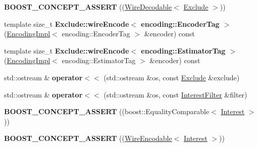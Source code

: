 \begin{DoxyCompactItemize}
\item 
{\bfseries B\+O\+O\+S\+T\+\_\+\+C\+O\+N\+C\+E\+P\+T\+\_\+\+A\+S\+S\+E\+RT} ((\hyperlink{classndn_1_1WireDecodable}{Wire\+Decodable}$<$ \hyperlink{classndn_1_1Exclude}{Exclude} $>$))\hypertarget{namespacendn_ac880ccd4f41297a74cac775e4c40661e}{}\label{namespacendn_ac880ccd4f41297a74cac775e4c40661e}

\item 
template size\+\_\+t {\bfseries Exclude\+::wire\+Encode$<$ encoding\+::\+Encoder\+Tag $>$} (\hyperlink{classndn_1_1encoding_1_1EncodingImpl}{Encoding\+Impl}$<$ encoding\+::\+Encoder\+Tag $>$ \&encoder) const\hypertarget{namespacendn_a38a7e12fd5c4f17a2ddd480d8f56fbe0}{}\label{namespacendn_a38a7e12fd5c4f17a2ddd480d8f56fbe0}

\item 
template size\+\_\+t {\bfseries Exclude\+::wire\+Encode$<$ encoding\+::\+Estimator\+Tag $>$} (\hyperlink{classndn_1_1encoding_1_1EncodingImpl}{Encoding\+Impl}$<$ encoding\+::\+Estimator\+Tag $>$ \&encoder) const\hypertarget{namespacendn_aff4fb8eecda68e37e99044b2024e0e4e}{}\label{namespacendn_aff4fb8eecda68e37e99044b2024e0e4e}

\item 
std\+::ostream \& {\bfseries operator$<$$<$} (std\+::ostream \&os, const \hyperlink{classndn_1_1Exclude}{Exclude} \&exclude)\hypertarget{namespacendn_ae38128c9ef91a2214738dfe36e5f7410}{}\label{namespacendn_ae38128c9ef91a2214738dfe36e5f7410}

\item 
std\+::ostream \& {\bfseries operator$<$$<$} (std\+::ostream \&os, const \hyperlink{classndn_1_1InterestFilter}{Interest\+Filter} \&filter)\hypertarget{namespacendn_aa1f7f6791dfc148a0c0e6f1a4caa4906}{}\label{namespacendn_aa1f7f6791dfc148a0c0e6f1a4caa4906}

\item 
{\bfseries B\+O\+O\+S\+T\+\_\+\+C\+O\+N\+C\+E\+P\+T\+\_\+\+A\+S\+S\+E\+RT} ((boost\+::\+Equality\+Comparable$<$ \hyperlink{classndn_1_1Interest}{Interest} $>$))\hypertarget{namespacendn_a0b0c976d295a73380263bec1ceb1d563}{}\label{namespacendn_a0b0c976d295a73380263bec1ceb1d563}

\item 
{\bfseries B\+O\+O\+S\+T\+\_\+\+C\+O\+N\+C\+E\+P\+T\+\_\+\+A\+S\+S\+E\+RT} ((\hyperlink{classndn_1_1WireEncodable}{Wire\+Encodable}$<$ \hyperlink{classndn_1_1Interest}{Interest} $>$))\hypertarget{namespacendn_a4426d0315411fed3d438822dda96488e}{}\label{namespacendn_a4426d0315411fed3d438822dda96488e}


\end{DoxyCompactItemize}
